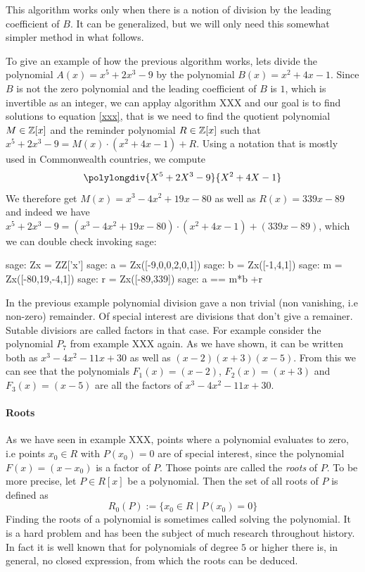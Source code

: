 This algorithm works only when there is a notion of division by the leading coefficient of $B$. It can be generalized, but we will only need this somewhat simpler method in what follows.
\begin{example} To give an example of how the previous algorithm works, lets divide the polynomial $A(x)=x^5+2x^3-9$ by the polynomial $B(x)=x^2+4x-1$. Since $B$ is not the zero polynomial and the leading coefficient of $B$ is $1$, which is invertible as an integer, we can applay algorithm XXX and our goal is to find solutions to equation \ref{xxx}, that is we need to find the quotient polynomial $M\in\mathbb{Z}[x]$ and the reminder polynomial $R \in \mathbb{Z}[x]$ such that $x^5+2x^3-9 = M(x)\cdot (x^2+4x-1) + R$. Using a notation that is mostly used in Commonwealth countries, we compute
\begin{equation}
\polylongdiv{X^5+2X^3-9}{X^2+4X-1}
\end{equation}
We therefore get $M(x)=x^3-4x^2+19x-80$ as well as $R(x)=339x-89$ and indeed we have $x^5+2x^3-9 = (x^3-4x^2+19x-80)\cdot (x^2+4x-1) + (339x-89)$, which we can double check invoking sage:
\begin{sagecommandline}
sage: Zx = ZZ['x']
sage: a = Zx([-9,0,0,2,0,1])
sage: b = Zx([-1,4,1])
sage: m = Zx([-80,19,-4,1])
sage: r = Zx([-89,339])
sage: a == m*b +r
\end{sagecommandline}
\end{example}
\begin{example} In the previous example polynomial division gave a non trivial (non vanishing, i.e non-zero) remainder. Of special interest are divisions that don't give a remainer. Sutable divisiors are called factors in that case. For example consider the polynomial $P_7$ from example XXX again. As we have shown, it can be written both as $x^3 - 4 x^2 - 11 x + 30$ as well as $(x-2)(x + 3)(x-5)$. From this we can see that the polynomials $F_1(x)=(x-2)$, $F_2(x)=(x+3)$ and $F_3(x)=(x-5)$ are all the factors of $x^3 - 4 x^2 - 11 x + 30$.
\end{example}

\paragraph{Roots}
As we have seen in example XXX, points where a polynomial evaluates to zero, i.e points $x_0\in R$ with $P(x_0)=0$ are of special interest, since the polynomial $F(x)=(x-x_0)$ is a factor of $P$. Those points are called the \textit{roots} of $P$. To be more precise, let $P\in R[x]$ be a polynomial. Then the set of all roots of $P$ is defined as
\begin{equation}
R_0(P):=\{x_0\in R\;|\; P(x_0)=0\}
\end{equation}
Finding the roots of a polynomial is sometimes called solving the polynomial. It is a hard problem and has been the subject of much research throughout history. In fact it is well known that for polynomials of degree $5$ or higher there is, in general, no closed expression, from which the roots can be deduced. 

